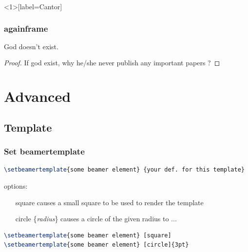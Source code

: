 \documentclass[11pt,pdf,aspectratio=43]{beamer}
\begin{document}
\begin{frame}<1>[label=Cantor]
    \frametitle{againframe}

    \begin{Theorem}
	God doesn't exist.
    \end{Theorem}

    \begin{overprint}
	\hyperlink{Cantor<2>}{}

	\begin{proof}
	    If god exist, why he/she never publish any important papers ?
	\end{proof}

	\hfill\hyperlink{Cantor<1>}{}
    \end{overprint}

\end{frame}

\section{Advanced}

\subsection*{Template}

\begin{frame}[fragile]
    \frametitle{Set beamertemplate}

    \begin{lstlisting}[language=TeX]
\setbeamertemplate{some beamer element} {your def. for this template}
    \end{lstlisting}

    options:
    \begin{itemize}
	\item [square] causes a small square to be used to render the template
	\item [circle]\{{\it radius}\} causes a circle of the given radius to ...
    \end{itemize}

    \begin{lstlisting}[language=TeX]
\setbeamertemplate{some beamer element} [square]
\setbeamertemplate{some beamer element} [circle]{3pt}
    \end{lstlisting}

\end{frame}
\end{document}
